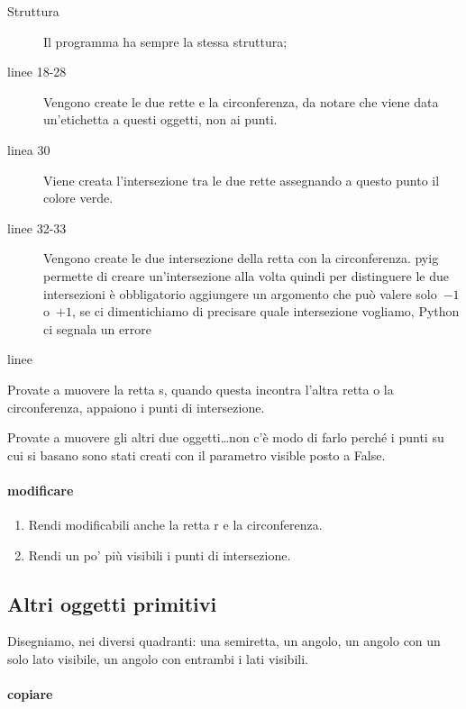 \begin{description}
 \item [Struttura] 
 Il programma ha sempre la stessa struttura;
 \item [linee 18-28]
Vengono create le due rette e la circonferenza, da notare che viene data 
un'etichetta a questi oggetti, non ai punti.
 \item [linea 30]
Viene creata l'intersezione tra le due rette assegnando a questo punto il 
colore verde.
 \item [linee 32-33]
Vengono create le due intersezione della retta con la circonferenza. 
{\ttfamily pyig} permette di creare un'intersezione alla volta quindi per 
distinguere le due intersezioni è obbligatorio aggiungere un argomento che può 
valere solo~\(-1\) o~\(+1\), se ci dimentichiamo di precisare quale 
intersezione vogliamo, Python ci segnala un errore
 \item [linee ]
\end{description}

\begin{osservazione}
Provate a muovere la retta s, quando questa incontra l'altra retta o la 
circonferenza, appaiono i punti di intersezione.

Provate a muovere gli altri due oggetti\dots non c'è modo di farlo perché i 
punti su cui si basano sono stati creati con il parametro {\ttfamily visible} 
posto a {\ttfamily False}.
\end{osservazione}

\paragraph{modificare}

\begin{enumerate} [noitemsep]
 \item Rendi modificabili anche la retta r e la circonferenza.
 \item Rendi un po' più visibili i punti di intersezione.
\end{enumerate}

\subsection{Altri oggetti primitivi}
\label{subsec:geo_int_altrioggetti}
Disegniamo, nei diversi quadranti: una semiretta, un angolo, un angolo con un 
solo lato visibile, un angolo con entrambi i lati visibili.

\paragraph{copiare}
{~}

